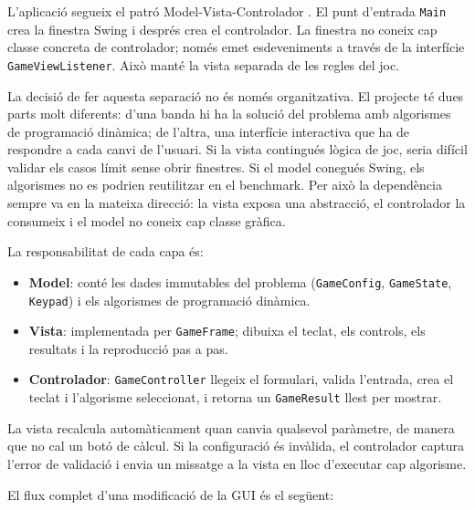\documentclass[conference,compsoc]{IEEEtran}
\begin{document}
L'aplicació segueix el patró Model-Vista-Controlador \cite{ref_mvc_wikipedia}. El punt
d'entrada \texttt{Main} crea la finestra Swing i després crea el controlador.
La finestra no coneix cap classe concreta de controlador; només emet esdeveniments a
través de la interfície \texttt{GameViewListener}. Això manté la vista separada
de les regles del joc.

La decisió de fer aquesta separació no és només organitzativa. El projecte té
dues parts molt diferents: d'una banda hi ha la solució del problema amb algorismes
de programació dinàmica; de l'altra, una interfície interactiva que ha de respondre
a cada canvi de l'usuari. Si la vista contingués lògica de joc, seria difícil validar
els casos límit sense obrir finestres. Si el model conegués Swing, els algorismes
no es podrien reutilitzar en el benchmark. Per això la dependència sempre va en
la mateixa direcció: la vista exposa una abstracció, el controlador la consumeix
i el model no coneix cap classe gràfica.

La responsabilitat de cada capa és:

\begin{itemize}
    \item \textbf{Model}: conté les dades immutables del problema
          (\texttt{GameConfig}, \texttt{GameState}, \texttt{Keypad}) i els
          algorismes de programació dinàmica.
    \item \textbf{Vista}: implementada per \texttt{GameFrame}; dibuixa el
          teclat, els controls, els resultats i la reproducció pas a pas.
    \item \textbf{Controlador}: \texttt{GameController} llegeix el formulari,
          valida l'entrada, crea el teclat i l'algorisme seleccionat, i retorna
          un \texttt{GameResult} llest per mostrar.
\end{itemize}

La vista recalcula automàticament quan canvia qualsevol paràmetre, de manera que
no cal un botó de càlcul. Si la configuració és invàlida, el controlador captura
l'error de validació i envia un missatge a la vista en lloc d'executar cap algorisme.

El flux complet d'una modificació de la GUI és el següent:
\end{document}
